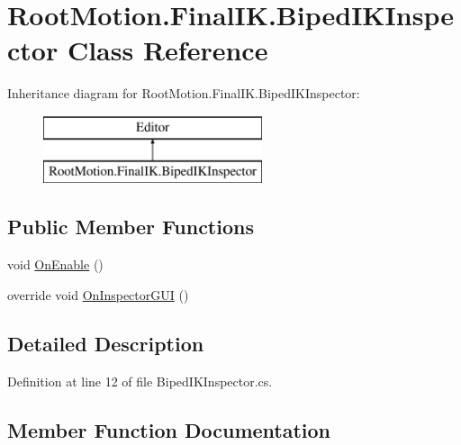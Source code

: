 \hypertarget{class_root_motion_1_1_final_i_k_1_1_biped_i_k_inspector}{}\section{Root\+Motion.\+Final\+I\+K.\+Biped\+I\+K\+Inspector Class Reference}
\label{class_root_motion_1_1_final_i_k_1_1_biped_i_k_inspector}
Inheritance diagram for Root\+Motion.\+Final\+I\+K.\+Biped\+I\+K\+Inspector\+:\begin{figure}[H]
\begin{center}
\leavevmode
\includegraphics[height=2.000000cm]{class_root_motion_1_1_final_i_k_1_1_biped_i_k_inspector}
\end{center}
\end{figure}
\subsection*{Public Member Functions}
\begin{DoxyCompactItemize}
\item 
void \mbox{\hyperlink{class_root_motion_1_1_final_i_k_1_1_biped_i_k_inspector_ae77fdddc96998f838ee85c8c55b1f0cd}{On\+Enable}} ()
\item 
override void \mbox{\hyperlink{class_root_motion_1_1_final_i_k_1_1_biped_i_k_inspector_a14ac6ead196508bf096e4801b6fa34ed}{On\+Inspector\+G\+UI}} ()
\end{DoxyCompactItemize}


\subsection{Detailed Description}


Definition at line 12 of file Biped\+I\+K\+Inspector.\+cs.



\subsection{Member Function Documentation}
\mbox{\label{class_root_motion_1_1_final_i_k_1_1_biped_i_k_inspector_ae77fdddc96998f838ee85c8c55b1f0cd}} 
